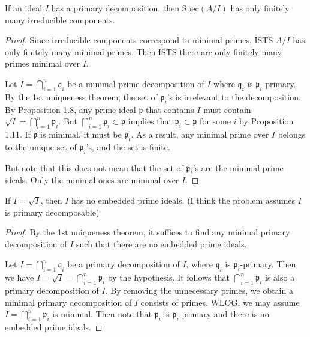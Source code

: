 \documentclass{solution}
\begin{document}
\begin{problem}
    If an ideal $I$ has a primary decomposition, then $\mathrm{Spec}(A / I)$ has only finitely many irreducible components.
\end{problem}

\begin{proof}
    Since irreducible components correspond to minimal primes, ISTS $A / I$ has only finitely many minimal primes. Then ISTS there are only finitely many primes minimal over $I$.

    Let $I = \bigcap\limits_{i = 1}^{n} \mathfrak{q}_i$ be a minimal prime decomposition of $I$ where $\mathfrak{q}_i$ is $\mathfrak{p}_i$-primary. By the 1st uniqueness theorem, the set of $\mathfrak{p}_i$'s is irrelevant to the decomposition. By Proposition 1.8, any prime ideal $\mathfrak{p}$ that contains $I$ must contain $\sqrt{I} = \bigcap\limits_{i = 1}^{n} \mathfrak{p}_i$. But $\bigcap\limits_{i = 1}^{n} \mathfrak{p}_i \subset \mathfrak{p}$ implies that $\mathfrak{p}_i \subset \mathfrak{p}$ for some $i$ by Proposition 1.11. If $\mathfrak{p}$ is minimal, it must be $\mathfrak{p}_i$. As a result, any minimal prime over $I$ belongs to the unique set of $\mathfrak{p}_i$'s, and the set is finite.

    {\color{red} But note that this does not mean that the set of $\mathfrak{p}_i$'s are the minimal prime ideals. Only the minimal ones are minimal over $I$.}
\end{proof}

\begin{problem}
    If $I = \sqrt{I}$, then $I$ has no embedded prime ideals. (I think the problem assumes $I$ is primary decomposable)
\end{problem}

\begin{proof}
    By the 1st uniqueness theorem, it suffices to find any minimal primary decomposition of $I$ such that there are no embedded prime ideals.

    Let $I = \bigcap\limits_{i = 1}^{n} \mathfrak{q}_i$ be a primary decomposition of $I$, where $\mathfrak{q}_i$ is $\mathfrak{p}_i$-primary. Then we have $I = \sqrt{I} = \bigcap\limits_{i = 1}^{n} \mathfrak{p}_i$ by the hypothesis. It follows that $\bigcap\limits_{i = 1}^{n} \mathfrak{p}_i$ is also a primary decomposition of $I$. By removing the unnecessary primes, we obtain a minimal primary decomposition of $I$ consists of primes. WLOG, we may assume $I = \bigcap\limits_{i = 1}^{n} \mathfrak{p}_i$ is minimal. Then note that $\mathfrak{p}_i$ is $\mathfrak{p}_i$-primary and there is no embedded prime ideals.
\end{proof}
\end{document}
